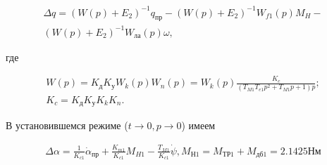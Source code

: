 \begin{comment}
\begin{equation}%
\label{eq:p4:415}
\begin{alignedat}{2}
\Delta  \alpha =\frac{1}{1+W_{1} \left( p \right) } \alpha _{\textit{пр}}-\frac{W_{f1} \left( p \right) }{1+W_{1} \left( p \right) }M_{H1}-\frac{W_{ \psi } \left( p \right) }{1+W_{1} \left( p \right) } \dot \psi,
\end{alignedat}
\end{equation}
\end{comment}

\begin{equation}%
\label{eq:p4:415}
\begin{alignedat}{2}
\Delta  q = 
(W(p)+E_2)^{-1} q _{\textit{пр}}-
(W(p)+E_2)^{-1} W_{f1} \left( p \right) M_{H}-\\
(W(p)+E_2)^{-1} W_{\textit{ла}} (p) \omega,
\end{alignedat}
\end{equation}

где 
\begin{comment}
\begin{equation}
\label{eq:p4:415+}
\begin{alignedat}{2}
 W_{1} \left( p \right) =
 K_{\textit{д1}}K_{\textit{у1}}W_{k1} \left( p \right) W_{n1} \left( p \right) =
 W_{k1} \left( p \right) \frac{K_{c1}}{ \left( T_{M1}T_{e1}p^{2}+T_{M1}p+1 \right) p}; \\
  K_{c1}=K_{\textit{д1}}K_{\textit{у1}}K_{k1}K_{n1}.
\end{alignedat}
\end{equation}
\end{comment}

\begin{equation}
\label{eq:p4:415+}
\begin{alignedat}{2}
W \left( p \right) =
K_{\textit{д}}K_{\textit{у}}W_{k} \left( p \right) W_{n} \left( p \right) =
W_{k} \left( p \right) \frac{K_{c}}{ \left( T_{M1}T_{e1}p^{2}+T_{M1}p+1 \right) p}; \\
K_{c}=K_{\textit{д}}K_{\textit{у}}K_{k}K_{n}.
\end{alignedat}
\end{equation}

В установившемся режиме ($t\rightarrow0, p\rightarrow0$) имеем\par

\begin{equation}
\label{eq:p4:415+2}
\begin{alignedat}{2}
\Delta  \alpha =
\frac{1}{K_{c1}} \dot \alpha_{\textit{пр}} + \frac{K_{m1}}{K_{c1}}M_{H1} - \frac{T_{M1}}{K_{c1}} \dot \psi ,
M_{Н1}=M_{\textit{ТР1}}+M_{\textit{дб1}}=2.1425\textit{Нм}
\end{alignedat}
\end{equation}


